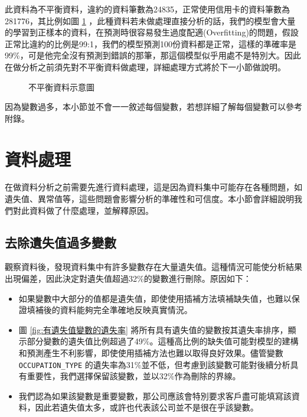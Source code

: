 \documentclass[12pt, a4paper]{article}
\begin{document}
此資料為不平衡資料，違約的資料筆數為24835，正常使用信用卡的資料筆數為281776，其比例如圖 \ref{fig:不平衡資料示意圖} ，此種資料若未做處理直接分析的話，我們的模型會大量的學習到正樣本的資料，在預測時很容易發生過度配適(Overfitting)的問題，假設正常比違約的比例是99:1，我們的模型預測100份資料都是正常，這樣的準確率是99\%，可是他完全沒有預測到錯誤的那筆，那這個模型似乎用處不是特別大。因此在做分析之前須先對不平衡資料做處理，詳細處理方式將於下一小節做說明。

\begin{figure}[H]
    \centering
    \caption{不平衡資料示意圖}
    \label{fig:不平衡資料示意圖}
\end{figure}

因為變數過多，本小節並不會一一敘述每個變數，若想詳細了解每個變數可以參考附錄。

\section{資料處理}

在做資料分析之前需要先進行資料處理，這是因為資料集中可能存在各種問題，如遺失值、異常值等，這些問題會影響分析的準確性和可信度。本小節會詳細說明我們對此資料做了什麼處理，並解釋原因。

\subsection{去除遺失值過多變數}

觀察資料後，發現資料集中有許多變數存在大量遺失值。這種情況可能使分析結果出現偏差，因此決定對遺失值超過32\%的變數進行刪除。原因如下：

\begin{itemize}
\item 如果變數中大部分的值都是遺失值，即使使用插補方法填補缺失值，也難以保證填補後的資料能夠完全準確地反映真實情況。

\item 圖 \ref{fig:有遺失值變數的遺失率} 將所有具有遺失值的變數按其遺失率排序，顯示部分變數的遺失值比例超過了49\%。這種高比例的缺失值可能對模型的建構和預測產生不利影響，即使使用插補方法也難以取得良好效果。儘管變數 \verb|OCCUPATION_TYPE| 的遺失率為31\%並不低，但考慮到該變數可能對後續分析具有重要性，我們選擇保留該變數，並以32\%作為刪除的界線。

\item 我們認為如果該變數是重要變數，那公司應該會特別要求客戶盡可能填寫該資料，因此若遺失值太多，或許也代表該公司並不是很在乎該變數。
\end{itemize}
\end{document}
